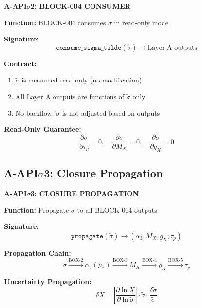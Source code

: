 \documentclass[11pt,letterpaper]{article}
\newcommand{\st}{\tilde{\sigma}}
\begin{document}
\begin{apibox}
\textbf{A-API$\sigma$2: BLOCK-004 CONSUMER}

\textbf{Function:} BLOCK-004 consumes $\st$ in read-only mode

\textbf{Signature:}
\begin{equation}
\texttt{consume\_sigma\_tilde}(\st) \to \text{Layer A outputs}
\label{eq:api-sigma2}
\end{equation}

\textbf{Contract:}
\begin{enumerate}[noitemsep]
\item $\st$ is consumed read-only (no modification)
\item All Layer A outputs are functions of $\st$ only
\item No backflow: $\st$ is not adjusted based on outputs
\end{enumerate}

\textbf{Read-Only Guarantee:}
\begin{equation}
\frac{\partial \st}{\partial \tau_p} = 0, \quad \frac{\partial \st}{\partial M_X} = 0, \quad \frac{\partial \st}{\partial g_X} = 0
\label{eq:read-only}
\end{equation}
\end{apibox}

\subsection{A-API$\sigma$3: Closure Propagation}
\label{subsec:api-sigma3}

\begin{apibox}
\textbf{A-API$\sigma$3: CLOSURE PROPAGATION}

\textbf{Function:} Propagate $\st$ to all BLOCK-004 outputs

\textbf{Signature:}
\begin{equation}
\texttt{propagate}(\st) \to (\alpha_3, M_X, g_X, \tau_p)
\label{eq:api-sigma3}
\end{equation}

\textbf{Propagation Chain:}
\begin{equation}
\st \xrightarrow{\text{BOX-2}} \alpha_3(\mu_*) \xrightarrow{\text{BOX-3}} M_X \xrightarrow{\text{BOX-4}} g_X \xrightarrow{\text{BOX-5}} \tau_p
\label{eq:propagation-chain}
\end{equation}

\textbf{Uncertainty Propagation:}
\begin{equation}
\delta X = \left| \frac{\partial \ln X}{\partial \ln \st} \right| \cdot \st \cdot \frac{\delta\st}{\st}
\label{eq:uncertainty-prop}
\end{equation}
\end{apibox}
\end{document}
